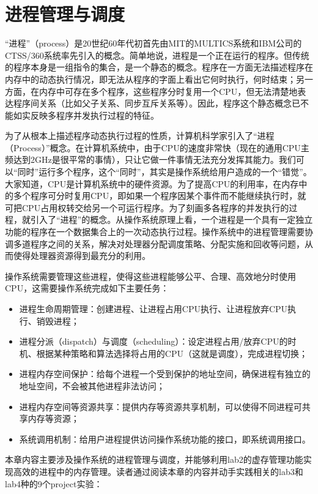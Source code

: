 \section{进程管理与调度}\label{ux8fdbux7a0bux7ba1ux7406ux4e0eux8c03ux5ea6}

``进程''（process）是20世纪60年代初首先由MIT的MULTICS系统和IBM公司的CTSS/360系统率先引入的概念。简单地说，进程是一个正在运行的程序。但传统的程序本身是一组指令的集合，是一个静态的概念。程序在一方面无法描述程序在内存中的动态执行情况，即无法从程序的字面上看出它何时执行，何时结束；另一方面，在内存中可存在多个程序，这些程序分时复用一个CPU，但无法清楚地表达程序间关系（比如父子关系、同步互斥关系等）。因此，程序这个静态概念已不能如实反映多程序并发执行过程的特征。

为了从根本上描述程序动态执行过程的性质，计算机科学家引入了``进程（Process）''概念。在计算机系统中，由于CPU的速度非常快（现在的通用CPU主频达到2GHz是很平常的事情），只让它做一件事情无法充分发挥其能力。我们可以``同时''运行多个程序，这个``同时''，其实是操作系统给用户造成的一个``错觉''。大家知道，CPU是计算机系统中的硬件资源。为了提高CPU的利用率，在内存中的多个程序可分时复用CPU，即如果一个程序因某个事件而不能继续执行时，就可把CPU占用权转交给另一个可运行程序。为了刻画多各程序的并发执行的过程，就引入了``进程''的概念。从操作系统原理上看，一个进程是一个具有一定独立功能的程序在一个数据集合上的一次动态执行过程。操作系统中的进程管理需要协调多道程序之间的关系，解决对处理器分配调度策略、分配实施和回收等问题，从而使得处理器资源得到最充分的利用。

操作系统需要管理这些进程，使得这些进程能够公平、合理、高效地分时使用CPU，这需要操作系统完成如下主要任务：

\begin{itemize}
\tightlist
\item
  进程生命周期管理：创建进程、让进程占用CPU执行、让进程放弃CPU执行、销毁进程；
\item
  进程分派（dispatch）与调度（scheduling）：设定进程占用/放弃CPU的时机、根据某种策略和算法选择将占用的CPU（这就是调度），完成进程切换；
\item
  进程内存空间保护：给每个进程一个受到保护的地址空间，确保进程有独立的地址空间，不会被其他进程非法访问；
\item
  进程内存空间等资源共享：提供内存等资源共享机制，可以使得不同进程可共享内存等资源；
\item
  系统调用机制：给用户进程提供访问操作系统功能的接口，即系统调用接口。
\end{itemize}

本章内容主要涉及操作系统的进程管理与调度，并能够利用lab2的虚存管理功能实现高效的进程中的内存管理。读者通过阅读本章的内容并动手实践相关的lab3和lab4种的9个project实验：

